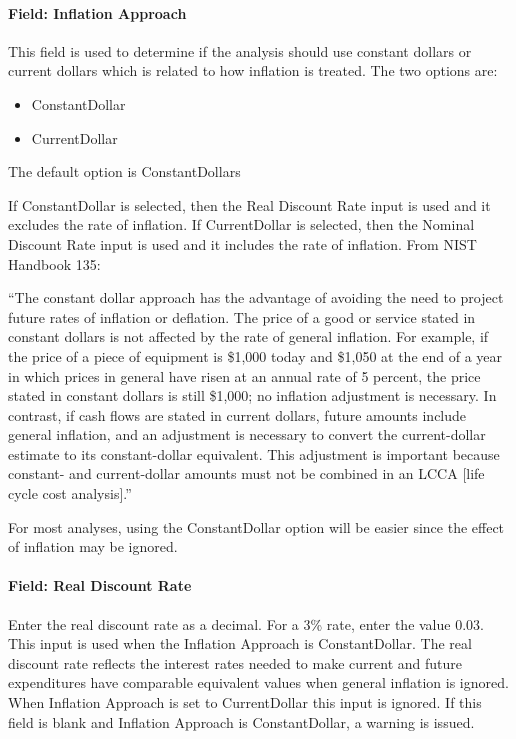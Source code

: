 \paragraph{Field: Inflation Approach}\label{field-inflation-approach}

This field is used to determine if the analysis should use constant dollars or current dollars which is related to how inflation is treated. The two options are:

\begin{itemize}
\item
  ConstantDollar
\item
  CurrentDollar
\end{itemize}

The default option is ConstantDollars

If ConstantDollar is selected, then the Real Discount Rate input is used and it excludes the rate of inflation. If CurrentDollar is selected, then the Nominal Discount Rate input is used and it includes the rate of inflation. From NIST Handbook 135:

``The constant dollar approach has the advantage of avoiding the need to project future rates of inflation or deflation. The price of a good or service stated in constant dollars is not affected by the rate of general inflation. For example, if the price of a piece of equipment is \$1,000 today and \$1,050 at the end of a year in which prices in general have risen at an annual rate of 5 percent, the price stated in constant dollars is still \$1,000; no inflation adjustment is necessary. In contrast, if cash flows are stated in current dollars, future amounts include general inflation, and an adjustment is necessary to convert the current-dollar estimate to its constant-dollar equivalent. This adjustment is important because constant- and current-dollar amounts must not be combined in an LCCA {[}life cycle cost analysis{]}.''

For most analyses, using the ConstantDollar option will be easier since the effect of inflation may be ignored.

\paragraph{Field: Real Discount Rate}\label{field-real-discount-rate}

Enter the real discount rate as a decimal. For a 3\% rate, enter the value 0.03. This input is used when the Inflation Approach is ConstantDollar. The real discount rate reflects the interest rates needed to make current and future expenditures have comparable equivalent values when general inflation is ignored. When Inflation Approach is set to CurrentDollar this input is ignored. If this field is blank and Inflation Approach is ConstantDollar, a warning is issued.

